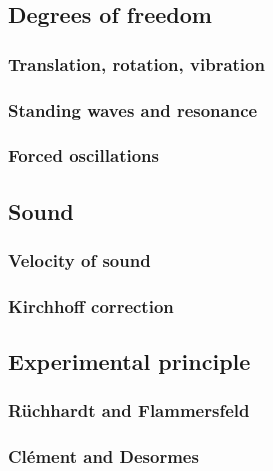 \documentclass{subfiles}
\begin{document}
    \subsection{Degrees of freedom}

        \subsubsection*{Translation, rotation, vibration}

        \subsubsection*{Standing waves and resonance}

        \subsubsection*{Forced oscillations}

    \subsection{Sound}

        \subsubsection*{Velocity of sound}

        \subsubsection*{Kirchhoff correction}

        \subsection{Experimental principle}

        \subsubsection*{Rüchhardt and Flammersfeld}

        \subsubsection*{Clément and Desormes}


\end{document}
